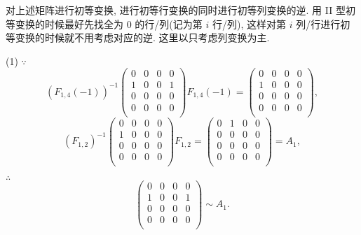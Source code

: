 \documentclass[color=black,device=normal,lang=cn,mode=geye]{elegantnote}
\begin{document}
\begin{solution}
    对上述矩阵进行初等变换, 进行初等行变换的同时进行初等列变换的逆. 用 II 型初等变换的时候最好先找全为 $0$ 的行/列(记为第 $i$ 行/列), 这样对第 $i$ 列/行进行初等变换的时候就不用考虑对应的逆. 这里以只考虑列变换为主.
    
    (1) $\because$
    \[(F_{1,4}(-1))^{-1}\begin{pmatrix}
        0 & 0 & 0 & 0 \\
        1 & 0 & 0 & 1 \\
        0 & 0 & 0 & 0 \\
        0 & 0 & 0 & 0 \\
    \end{pmatrix}F_{1,4}(-1)=\begin{pmatrix}
        0 & 0 & 0 & 0 \\
        1 & 0 & 0 & 0 \\
        0 & 0 & 0 & 0 \\
        0 & 0 & 0 & 0 \\
    \end{pmatrix},\]
    \[(F_{1,2})^{-1}\begin{pmatrix}
        0 & 0 & 0 & 0 \\
        1 & 0 & 0 & 0 \\
        0 & 0 & 0 & 0 \\
        0 & 0 & 0 & 0 \\
    \end{pmatrix}F_{1,2}=\begin{pmatrix}
        0 & 1 & 0 & 0 \\
        0 & 0 & 0 & 0 \\
        0 & 0 & 0 & 0 \\
        0 & 0 & 0 & 0 \\
    \end{pmatrix}=A_1,\]

    $\therefore$
    \[\begin{pmatrix}
        0 & 0 & 0 & 0 \\
        1 & 0 & 0 & 1 \\
        0 & 0 & 0 & 0 \\
        0 & 0 & 0 & 0 \\
    \end{pmatrix}\sim A_1.\]


\end{solution}
\end{document}
